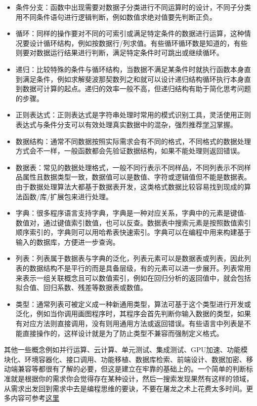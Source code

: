 \documentclass[]{tufte-book}
\begin{document}
\begin{itemize}
\item
  条件分支：函数中出现需要对数据子分类进行不同运算时的设计，不同子分类用不同条件语句进行逻辑判断，例如数值求绝对值要先判断正负。
\item
  循环：同样的操作要对不同的可索引或满足特定条件的数据进行运算，这种情况要设计循环结构，例如按数据行/列求值。有些循环循环数是知道的，有些则要对数据运行结果进行判断，满足特定条件时可跳出或继续循环。
\item
  递归：比较特殊的条件与循环结构，当数据不满足某条件时就执行函数本身直到满足条件，例如求解斐波那契数列之和就可以设计递归结构循环执行本身直到数据可计算的起点。递归的效率一般不高，但递归结构有助于简化思考问题的步骤。
\item
  正则表达式：正则表达式是字符串处理时常用的模式识别工具，灵活使用正则表达式与条件分支可以有效处理真实数据中的混杂，强烈推荐\href{https://zh.wikipedia.org/zh-hans/\%E6\%AD\%A3\%E5\%88\%99\%E8\%A1\%A8\%E8\%BE\%BE\%E5\%BC\%8F}{学习}掌握。
\item
  数据结构：通常不同数据按照实际需求会有不同的格式，不同格式的数据处理方式会不一样，一般函数都会先验证数据结构，如果不能处理则返回错误。
\item
  数据表：常见的数据处理格式，一般不同行表示不同样品，不同列表示不同样品属性且数据类型一致，数据值可以是数值、字符或逻辑值但不能是数据表。由于数据处理算法大都基于数据表开发，这类格式数据比较容易找到现成的算法函数/库/扩展包来进行处理。
\item
  字典：很多程序语言支持字典，字典是一种对应关系，字典中的元素是键值-数值对，通过键值索引数值，也可以反查。数据表中搜索元素是按照数值索引顺序索引的，字典则可以用哈希表快速索引。字典可以在编程中用来构建基于输入的数据库，方便进一步查询。
\item
  列表：列表属于数据表与字典的泛化，列表元素可以是数据表或列表，因此列表的数据结构不是平行的而是具备层级，有的元素可以进一步展开。列表常用来表示一组关联概念且可以数值索引，例如在回归分析的返回值中，就会包括拟合值、回归系数、残差等数据表或数值。
\item
  类型：通常列表可被定义成一种新通用类型，算法可基于这个类型进行开发或泛化，例如当你调用画图程序时，其程序会首先判断你输入数据的类型，如果有对应方法则直接调用，没有则用通用方法或返回错误。有些语言中列表是不能直接操作的，这样设计就是为了防止类型不兼容而强制定义格式。
\end{itemize}

其他一些概念例如并行运算、云计算、单元测试、集成测试、GPU加速、功能模块化、环境容器化、接口调用、功能移植、数据库检索、前端设计、数据加密、移动端兼容等都很有了解的必要，但这是建立在牢靠的基础上的。一个简单的判断标准就是根据你的需求你会觉得存在某种设计，然后一搜索发现果然有这样的领域，从需求出发回到需求中去是编程思维的要诀，不要在屠龙之术上花费太多时间。更多内容可参考\href{https://benlauwens.github.io/ThinkJulia.jl/latest/book.html}{这里}
\end{document}
